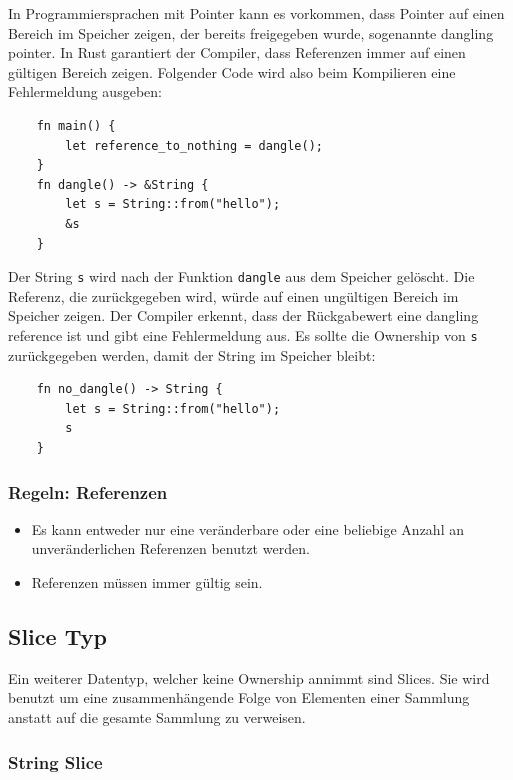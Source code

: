 In Programmiersprachen mit Pointer kann es vorkommen, dass Pointer auf einen Bereich im Speicher zeigen, der bereits freigegeben wurde, sogenannte \glqq dangling pointer\grqq{}. In Rust garantiert der Compiler, dass Referenzen immer auf einen gültigen Bereich zeigen. Folgender Code wird also beim Kompilieren eine Fehlermeldung ausgeben:

\begin{lstlisting}
    fn main() {
        let reference_to_nothing = dangle();
    }
    fn dangle() -> &String {
        let s = String::from("hello");
        &s
    }
\end{lstlisting}

Der String \verb"s" wird nach der Funktion \verb"dangle" aus dem Speicher gelöscht. Die Referenz, die zurückgegeben wird, würde auf einen ungültigen Bereich im Speicher zeigen. Der Compiler erkennt, dass der Rückgabewert eine \glqq dangling reference\grqq{} ist und gibt eine Fehlermeldung aus. Es sollte die Ownership von \verb"s" zurückgegeben werden, damit der String im Speicher bleibt:

\begin{lstlisting}
    fn no_dangle() -> String {
        let s = String::from("hello");
        s
    }
\end{lstlisting}

\subsubsection{Regeln: Referenzen}

\begin{itemize}
    \item Es kann entweder nur eine veränderbare oder eine beliebige Anzahl an unveränderlichen Referenzen benutzt werden.
    \item Referenzen müssen immer gültig sein.
\end{itemize}

\subsection{Slice Typ}

Ein weiterer Datentyp, welcher keine Ownership annimmt sind Slices. Sie wird benutzt um eine zusammenhängende Folge von Elementen einer Sammlung anstatt auf die gesamte Sammlung zu verweisen.

\subsubsection{String Slice}

